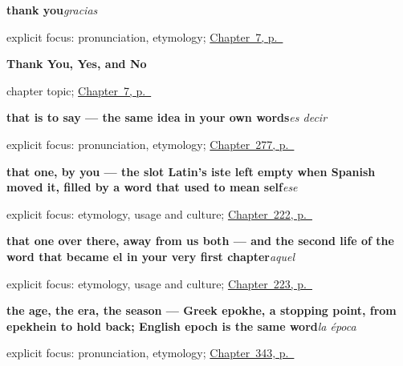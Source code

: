 \noindent\begin{minipage}[t]{\linewidth}
\raggedright
\textbf{thank you}\enspace\emph{gracias}\par
\footnotesize explicit focus: pronunciation, etymology; \hyperref[ch:thank-you]{Chapter~7, p.~\pageref*{ch:thank-you}}
\end{minipage}\par\smallskip

\noindent\begin{minipage}[t]{\linewidth}
\raggedright
\textbf{Thank You, Yes, and No}\par
\footnotesize chapter topic; \hyperref[ch:thank-you]{Chapter~7, p.~\pageref*{ch:thank-you}}
\end{minipage}\par\smallskip

\noindent\begin{minipage}[t]{\linewidth}
\raggedright
\textbf{that is to say — the same idea in your own words}\enspace\emph{es decir}\par
\footnotesize explicit focus: pronunciation, etymology; \hyperref[ch:fuentes]{Chapter~277, p.~\pageref*{ch:fuentes}}
\end{minipage}\par\smallskip

\noindent\begin{minipage}[t]{\linewidth}
\raggedright
\textbf{that one, by you — the slot Latin's iste left empty when Spanish moved it, filled by a word that used to mean self}\enspace\emph{ese}\par
\footnotesize explicit focus: etymology, usage and culture; \hyperref[ch:ese]{Chapter~222, p.~\pageref*{ch:ese}}
\end{minipage}\par\smallskip

\noindent\begin{minipage}[t]{\linewidth}
\raggedright
\textbf{that one over there, away from us both — and the second life of the word that became el in your very first chapter}\enspace\emph{aquel}\par
\footnotesize explicit focus: etymology, usage and culture; \hyperref[ch:aquel]{Chapter~223, p.~\pageref*{ch:aquel}}
\end{minipage}\par\smallskip

\noindent\begin{minipage}[t]{\linewidth}
\raggedright
\textbf{the age, the era, the season — Greek epokhe, a stopping point, from epekhein to hold back; English epoch is the same word}\enspace\emph{la época}\par
\footnotesize explicit focus: pronunciation, etymology; \hyperref[ch:la-fecha-y-el-siglo]{Chapter~343, p.~\pageref*{ch:la-fecha-y-el-siglo}}
\end{minipage}\par\smallskip

